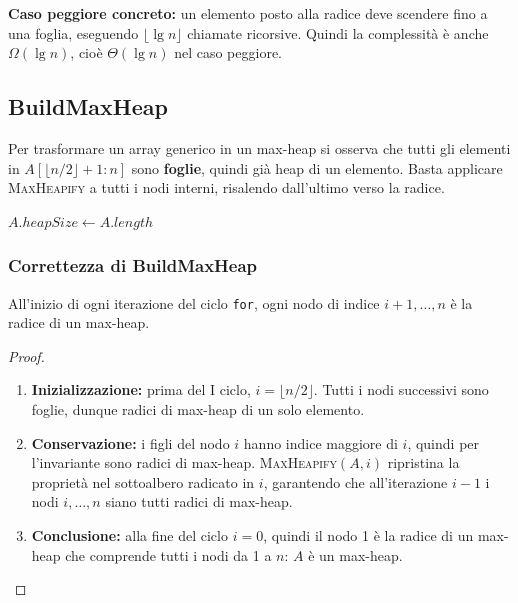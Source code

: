 \begin{hardnote}
	\textbf{Caso peggiore concreto:} un elemento posto alla radice deve
	scendere fino a una foglia, eseguendo $\lfloor \lg n \rfloor$ chiamate
	ricorsive. Quindi la complessità è anche $\Omega(\lg n)$, cioè
	$\Theta(\lg n)$ nel caso peggiore.
\end{hardnote}

\subsection{BuildMaxHeap}

\begin{softnote}
	Per trasformare un array generico in un max-heap si osserva che
	tutti gli elementi in $A[\lfloor n/2 \rfloor + 1 : n]$ sono
	\textbf{foglie}, quindi già heap di un elemento. Basta applicare
	\textsc{MaxHeapify} a tutti i nodi interni, risalendo dall'ultimo
	verso la radice.
\end{softnote}

\begin{algorithm}[H]
	\caption{\textsc{BuildMaxHeap}$(A)$}
	$A.\mathit{heapSize} \gets A.\mathit{length}$\;
\end{algorithm}

\subsubsection{Correttezza di BuildMaxHeap}

\begin{definizione}
	All'inizio di ogni iterazione del ciclo \texttt{for}, ogni nodo di
	indice $i+1, \ldots, n$ è la radice di un max-heap.
\end{definizione}

\begin{proof}
	\begin{enumerate}
		\item \textbf{Inizializzazione:} prima del I ciclo, $i = \lfloor n/2
		\rfloor$. Tutti i nodi successivi sono foglie, dunque radici di
		max-heap di un solo elemento. \checkmark
		\item \textbf{Conservazione:} i figli del nodo $i$ hanno indice
		maggiore di $i$, quindi per l'invariante sono radici di
		max-heap. \textsc{MaxHeapify}$(A, i)$ ripristina la proprietà
		nel sottoalbero radicato in $i$, garantendo che all'iterazione
		$i-1$ i nodi $i, \ldots, n$ siano tutti radici di max-heap.
		\checkmark
		\item \textbf{Conclusione:} alla fine del ciclo $i = 0$, quindi il
		nodo 1 è la radice di un max-heap che comprende tutti i nodi da
		1 a $n$: $A$ è un max-heap. \checkmark
	\end{enumerate}
\end{proof}

